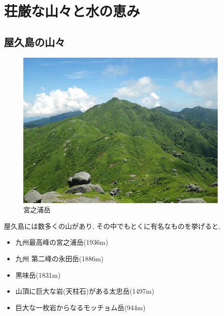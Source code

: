 \documentclass[10pt,titlepage,a5paper]{ltjsbook}
\begin{document}
  \section{荘厳な山々と水の恵み}
    \subsection*{屋久島の山々}
      \begin{minipage}{0.38\columnwidth}
      \begin{figure}[H]
        \centering
        \includegraphics[width=\columnwidth]{mt_miyanoura1.jpg}
        \caption{宮之浦岳}
        \label{fig:yakushima_mountains}
      \end{figure}
      \end{minipage}
      \hfill
      \begin{minipage}{0.58\columnwidth}
        屋久島には数多くの山があり, その中でもとくに有名なものを挙げると,
        \begin{itemize}
          \item 九州最高峰の宮之浦岳(1936m)\footnotemark[3]
          \item 九州 第二峰の永田岳(1886m)\footnotemark[3]
          \item 黒味岳(1831m)\footnotemark[3]
          \item 山頂に巨大な岩(天柱石)がある太忠岳(1497m)
          \item 巨大な一枚岩からなるモッチョム岳(944m)
        \end{itemize}
      \end{minipage}
    \newpage
\end{document}
